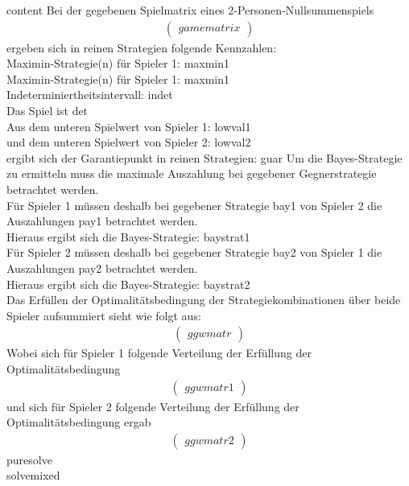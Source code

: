 \documentclass{article}
\begin{document}
{{ content }}
Bei der gegebenen Spielmatrix eines 2-Personen-Nullsummenspiels\\
\begin{gather*}
\begin{pmatrix*}
{{ gamematrix }}
\end{pmatrix*}
\end{gather*}
ergeben sich in reinen Strategien folgende Kennzahlen:\\
Maximin-Strategie(n) für Spieler 1: {{ maxmin1 }}\\
Maximin-Strategie(n) für Spieler 1: {{ maxmin1 }}\\
Indeterminiertheitsintervall: {{ indet }}\\
Das Spiel ist {{ det }}\\
Aus dem unteren Spielwert von Spieler 1: {{ lowval1 }}\\
und dem unteren Spielwert von Spieler 2: {{ lowval2} }\\
ergibt sich der Garantiepunkt in reinen Strategien: {{ guar }}
Um die Bayes-Strategie zu ermitteln muss die maximale Auszahlung bei gegebener Gegnerstrategie betrachtet werden.\\
Für Spieler 1 müssen deshalb bei gegebener Strategie {{ bay1 }} von Spieler 2 die Auszahlungen {{ pay1 }} betrachtet werden.\\
Hieraus ergibt sich die Bayes-Strategie: {{ baystrat1 }}\\
Für Spieler 2 müssen deshalb bei gegebener Strategie {{ bay2 }} von Spieler 1 die Auszahlungen {{ pay2 }} betrachtet werden.\\
Hieraus ergibt sich die Bayes-Strategie: {{ baystrat2 }}\\
Das Erfüllen der Optimalitätsbedingung der Strategiekombinationen über beide Spieler aufsummiert sieht wie folgt aus:\\
\begin{gather*}
\begin{pmatrix*}
{{ ggwmatr }}
\end{pmatrix*}
\end{gather*}
Wobei sich für Spieler 1 folgende Verteilung der Erfüllung der Optimalitätsbedingung\\
\begin{gather*}
\begin{pmatrix*}
{{ ggwmatr1 }}
\end{pmatrix*}
\end{gather*}
und sich für Spieler 2 folgende Verteilung der Erfüllung der Optimalitätsbedingung ergab\\
\begin{gather*}
\begin{pmatrix*}
{{ ggwmatr2 }}
\end{pmatrix*}
\end{gather*}
{{ puresolve }}\\
{{ solvemixed }}
\end{document}
